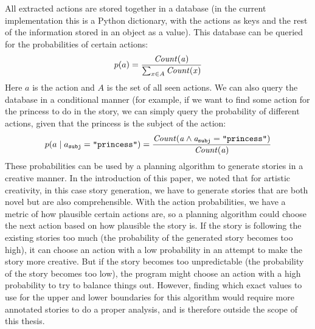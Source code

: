 All extracted actions are stored together in a database (in the current
implementation this is a Python dictionary, with the actions as keys and the
rest of the information stored in an object as a value). This database can be
queried for the probabilities of certain actions: 
$$p(a) = \frac{\it{Count}(a)}{\sum_{x \in A}\it{Count}(x)}$$
Here $a$ is the action and $A$ is the set of all seen actions.
We can also query the database in a conditional manner (for
example, if we want to find some action for the princess to do in the story, we
can simply query the probability of different actions, given that the princess
is the subject of the action:
$$p(a \mid a_{\texttt{subj}}=\texttt{"princess"}) = 
\frac{\it{Count}(a \land a_{\texttt{subj}}=\texttt{"princess"})}{\it{Count}(a)}$$
These probabilities can be used by a planning algorithm to generate stories in a
creative manner. In the introduction of this paper, we noted that for artistic
creativity, in this case story generation, we have to generate stories
that are both novel but are also comprehensible. With the action probabilities,
we have a metric of how plausible certain actions are, so a planning algorithm
could choose the next action based on how plausible the story is. If the story
is following the existing stories too much (the probability of the
generated story becomes too high), it can choose an action with a
low probability in an attempt to make the story more creative. But if the story becomes too
unpredictable (the probability of the story becomes too low), the program might
choose an action with a high probability to try to balance things out. However, finding
which exact values to use for the upper and lower boundaries for this algorithm
would require more annotated stories to do a proper analysis, and is therefore
outside the scope of this thesis.
